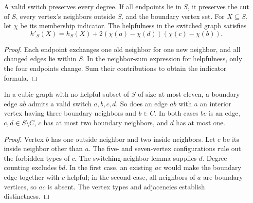 \begin{theorem}
  \label{thm:lowerbounds-algebraic-edge-switch-invariants}
  \leanok
  A valid switch preserves every degree. If all endpoints lie in $S$,
  it preserves the cut of $S$, every vertex's neighbors outside $S$,
  and the boundary vertex set. For $X\subseteq S$, let $\chi$ be its
  membership indicator. The helpfulness in the switched graph satisfies
  \[
    h'_S(X)=h_S(X)+2(\chi(a)-\chi(d))(\chi(c)-\chi(b)).
  \]
\end{theorem}
\begin{proof}
  \leanok
  Each endpoint exchanges one old neighbor for one new neighbor, and
  all changed edges lie within $S$. In the neighbor-sum expression for
  helpfulness, only the four endpoints change. Sum their contributions
  to obtain the indicator formula.
\end{proof}

\begin{theorem}
  \label{thm:lowerbounds-algebraic-edge-switch-existence}
  \leanok
  In a cubic graph with no helpful subset of $S$ of size at most eleven,
  a boundary edge $ab$ admits a valid switch $a,b,c,d$. So does an edge
  $ab$ with $a$ an interior vertex having three boundary neighbors and
  $b\in C$. In both cases $bc$ is an edge, $c,d\in S\setminus C$,
  $c$ has at most two boundary neighbors, and $d$ has at most one.
\end{theorem}
\begin{proof}
  \leanok
  Vertex $b$ has one outside neighbor and two inside neighbors. Let $c$
  be its inside neighbor other than $a$. The five- and seven-vertex
  configurations rule out the forbidden types of $c$. The switching-neighbor
  lemma supplies $d$. Degree counting excludes $bd$. In the first case,
  an existing $ac$ would make the boundary edge together with $c$ helpful;
  in the second case, all neighbors of $a$ are boundary vertices, so $ac$
  is absent. The vertex types and adjacencies establish distinctness.
\end{proof}

